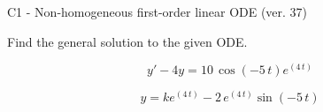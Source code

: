 \begin{exercise}
  \begin{exerciseTitle}C1 - Non-homogeneous first-order linear ODE (ver. 37)\end{exerciseTitle}
  \begin{exerciseStatement}
    
Find the general solution to the given ODE.

    
\[y'-4y= 10 \, \cos\left(-5 \, t\right) e^{\left(4 \, t\right)}\]

  \end{exerciseStatement}
  \begin{exerciseAnswer}
    
\[y= k e^{\left(4 \, t\right)} - 2 \, e^{\left(4 \, t\right)} \sin\left(-5 \, t\right)\]

  \end{exerciseAnswer}
\end{exercise}